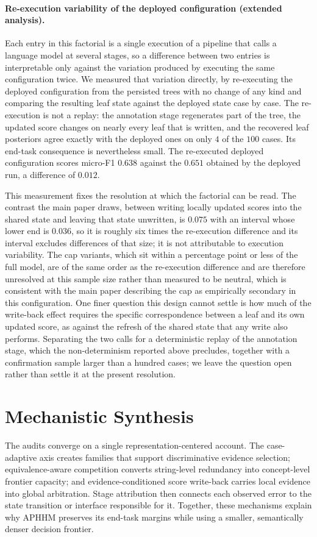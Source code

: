 \documentclass[letterpaper]{article}
\begin{document}
\paragraph{Re-execution variability of the deployed configuration (extended analysis).}
Each entry in this factorial is a single execution of a pipeline that calls a language model at several stages, so a difference between two entries is interpretable only against the variation produced by executing the same configuration twice.
We measured that variation directly, by re-executing the deployed configuration from the persisted trees with no change of any kind and comparing the resulting leaf state against the deployed state case by case.
The re-execution is not a replay: the annotation stage regenerates part of the tree, the updated score changes on nearly every leaf that is written, and the recovered leaf posteriors agree exactly with the deployed ones on only $4$ of the $100$ cases.
Its end-task consequence is nevertheless small.
The re-executed deployed configuration scores micro-F1 $0.638$ against the $0.651$ obtained by the deployed run, a difference of $0.012$.

This measurement fixes the resolution at which the factorial can be read.
The contrast the main paper draws, between writing locally updated scores into the shared state and leaving that state unwritten, is $0.075$ with an interval whose lower end is $0.036$, so it is roughly six times the re-execution difference and its interval excludes differences of that size; it is not attributable to execution variability.
The cap variants, which sit within a percentage point or less of the full model, are of the same order as the re-execution difference and are therefore unresolved at this sample size rather than measured to be neutral, which is consistent with the main paper describing the cap as empirically secondary in this configuration.
One finer question this design cannot settle is how much of the write-back effect requires the specific correspondence between a leaf and its own updated score, as against the refresh of the shared state that any write also performs.
Separating the two calls for a deterministic replay of the annotation stage, which the non-determinism reported above precludes, together with a confirmation sample larger than a hundred cases; we leave the question open rather than settle it at the present resolution.

\section{Mechanistic Synthesis}

The audits converge on a single representation-centered account.
The case-adaptive axis creates families that support discriminative evidence selection; equivalence-aware competition converts string-level redundancy into concept-level frontier capacity; and evidence-conditioned score write-back carries local evidence into global arbitration.
Stage attribution then connects each observed error to the state transition or interface responsible for it.
Together, these mechanisms explain why APHHM preserves its end-task margins while using a smaller, semantically denser decision frontier.


\end{document}
